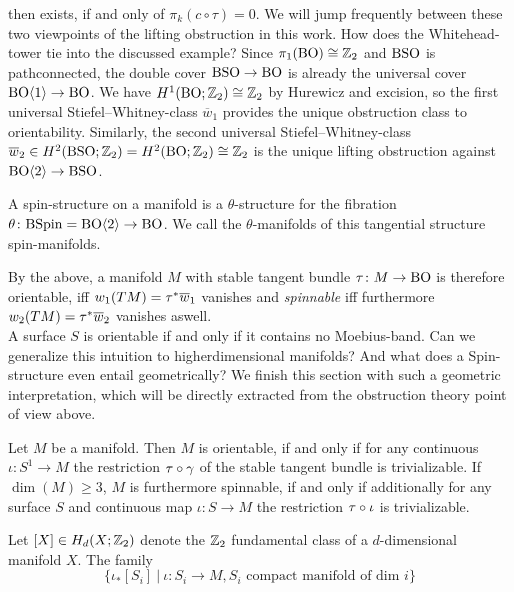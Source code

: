 then exists, if and only of $\pi_k(c\circ\tau) = 0$.
We will jump frequently between these two viewpoints of the lifting obstruction in this work.
How does the Whitehead-tower tie into the discussed example?
Since $\pi_1(\mathrm{BO})\cong \mathbb{Z}_2$ and $\mathrm{BSO}$ is pathconnected, the double cover $\mathrm{BSO} \to \mathrm{BO}$ is already the universal cover $\mathrm{BO}\langle 1 \rangle \to \mathrm{BO}$.
We have $H^1(\mathrm{BO};\mathbb{Z}_2) \cong \mathbb{Z}_2$ by Hurewicz and excision, so the first universal Stiefel--Whitney-class $\overline{w}_1$ provides the unique obstruction class to orientability.
Similarly, the second universal Stiefel--Whitney-class $\overline{w}_2\in H^2(\mathrm{BSO};\mathbb{Z}_2) = H^2(\mathrm{BO};\mathbb{Z}_2) \cong \mathbb{Z}_2$ is the unique lifting obstruction against $\mathrm{BO}\langle 2 \rangle \to \mathrm{BSO}$.
\begin{defi}[Spin]
    A spin-structure on a manifold is a $\theta$-structure for the fibration $\theta\colon \mathrm{BSpin} = \mathrm{BO}\langle 2\rangle \to \mathrm{BO}$. We call the $\theta$-manifolds of this tangential structure spin-manifolds.
\end{defi}
By the above, a manifold $M$ with stable tangent bundle $\tau\colon M \to \mathrm{BO}$ is therefore orientable, iff $w_1(TM) = \tau^\ast \overline{w}_1$ vanishes and \emph{spinnable} iff furthermore $w_2(TM) = \tau^\ast \overline{w}_2$ vanishes aswell.\\
A surface $S$ is orientable if and only if it contains no Moebius-band.
Can we generalize this intuition to higherdimensional manifolds?
And what does a Spin-structure even entail geometrically?
We finish this section with such a geometric interpretation, which will be directly extracted from the obstruction theory point of view above.
\begin{thesislemma}\label{geomspin}
Let $M$ be a manifold. Then $M$ is orientable, if and only if for any continuous $\iota\colon S^1 \to M$ the restriction $\tau\circ \gamma$ of the stable tangent bundle is trivializable.
    If $\dim(M)\geq 3$, $M$ is furthermore spinnable, if and only if additionally for any surface $S$ and continuous map $\iota\colon S\to M$ the restriction $\tau\circ \iota$ is trivializable. 
\end{thesislemma}
\pagebreak{} %
\prf
    Let $[X]\in H_d(X;\mathbb{Z}_2)$ denote the $\mathbb{Z}_2$ fundamental class of a $d$-dimensional manifold $X$. 
    The family
    \begin{equation*}
        \big\{ \iota_\ast [S_i] \:\big\vert\: \iota\colon S_i \to M, S_i \text{ compact manifold of dim } i \big\}
    \end{equation*}
